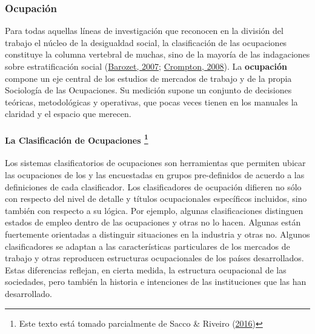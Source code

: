 \documentclass[
]{article}
\begin{document}
\hypertarget{ocupaciuxf3n}{%
\subsubsection{Ocupación}\label{ocupaciuxf3n}}

Para todas aquellas líneas de investigación que reconocen en la división del trabajo el núcleo de la desigualdad social, la clasificación de las ocupaciones constituye la columna vertebral de muchas, sino de la mayoría de las indagaciones sobre estratificación social (\protect\hyperlink{ref-Barozet2007}{Barozet, 2007}; \protect\hyperlink{ref-Crompton2008}{Crompton, 2008}). La \textbf{ocupación} compone un eje central de los estudios de mercados de trabajo y de la propia Sociología de las Ocupaciones. Su medición supone un conjunto de decisiones teóricas, metodológicas y operativas, que pocas veces tienen en los manuales la claridad y el espacio que merecen.

\hypertarget{la-clasificaciuxf3n-de-ocupaciones}{%
\paragraph[La Clasificación de Ocupaciones ]{\texorpdfstring{La Clasificación de Ocupaciones \footnote{Este texto está tomado parcialmente de Sacco \& Riveiro (\protect\hyperlink{ref-Sacco2016b}{2016})}}{La Clasificación de Ocupaciones }}\label{la-clasificaciuxf3n-de-ocupaciones}}

Los sistemas clasificatorios de ocupaciones son herramientas que permiten ubicar las ocupaciones de los y las encuestadas en grupos pre-definidos de acuerdo a las definiciones de cada clasificador. Los clasificadores de ocupación difieren no sólo con respecto del nivel de detalle y títulos ocupacionales específicos incluidos, sino también con respecto a su lógica. Por ejemplo, algunas clasificaciones distinguen estados de empleo dentro de las ocupaciones y otras no lo hacen. Algunas están fuertemente orientadas a distinguir situaciones en la industria y otras no. Algunos clasificadores se adaptan a las características particulares de los mercados de trabajo y otras reproducen estructuras ocupacionales de los países desarrollados. Estas diferencias reflejan, en cierta medida, la estructura ocupacional de las sociedades, pero también la historia e intenciones de las instituciones que las han desarrollado.
\end{document}
